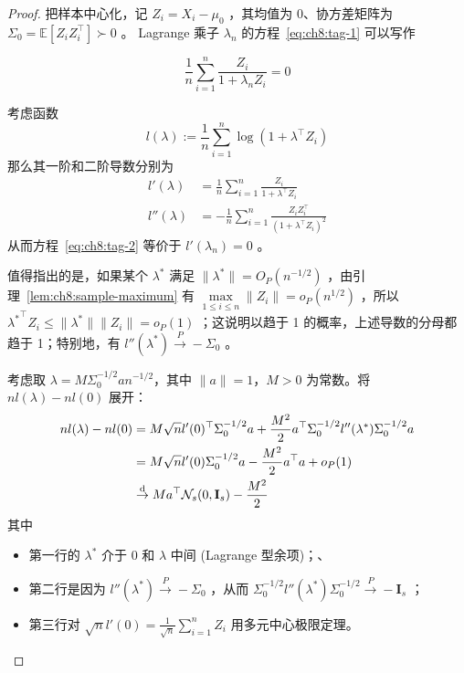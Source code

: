 \begin{proof}

把样本中心化，记 $Z_i=X_i-\mu_0$ ，其均值为 0、协方差矩阵为 $\Sigma_0=\mathbb{E}[Z_iZ_i^\top]\succ 0$ 。 Lagrange 乘子 $\lambda_n$ 的方程~\eqref{eq:ch8:tag-1} 可以写作

\begin{equation}
\label{eq:ch8:tag-2}
\frac1n\sum_{i=1}^n\frac{Z_i}{1+\lambda_n Z_i}=0
\end{equation}

考虑函数 \[ l(\lambda):=\frac1n\sum_{i=1}^n\log(1+\lambda^\top Z_i) \]那么其一阶和二阶导数分别为
\[\begin{aligned}l'(\lambda) &= \frac{1}{n}\sum_{i=1}^n \frac{Z_i}{1 + \lambda^\top Z_i}\\ l''(\lambda) &= -\frac{1}{n}\sum_{i=1}^n \frac{Z_iZ_i^\top}{(1 + \lambda^\top Z_i)^2} \end{aligned}\]
从而方程~\eqref{eq:ch8:tag-2} 等价于 $l'(\lambda_n)=0$ 。

值得指出的是，如果某个 $\lambda^*$ 满足 $\|\lambda^*\|=O_P(n^{-1/2})$ ，由引理~\ref{lem:ch8:sample-maximum} 有 $\max\limits_{1\le i\le n}\|Z_i\|=o_P(n^{1/2})$ ，所以 ${\lambda^*}^\top Z_i\le \|\lambda^*\|\|Z_i\|=o_P(1)$ ；这说明以趋于 1 的概率，上述导数的分母都趋于 1；特别地，有 $l''(\lambda^*) \overset{P}\to -\Sigma_0$ 。

考虑取 $\lambda = M \Sigma_0^{-1/2} a n^{-1/2}$，其中 $\|a\| = 1$，$M>0$ 为常数。将 $n l(\lambda) - n l(0)$ 展开：
\[\begin{aligned} n l(\lambda) - n l(0)  &= M\sqrt{n}l'(0)^\top \Sigma_0^{-1/2} a + \frac{M^2}{2} a^\top \Sigma_0^{-1/2} l''(\lambda^*) \Sigma_0^{-1/2} a \\ &= M\sqrt{n}l'(0) \Sigma_0^{-1/2} a - \frac{M^2}{2} a^\top a + o_P(1) \\ &\overset{\rm d}\to M a^\top \mathcal{N}_s(0, \mathbf I_s) - \frac{M^2}{2} \end{aligned}\]
其中

\begin{itemize}
\tightlist
\item
  第一行的 $\lambda^*$ 介于 $0$ 和 $\lambda$ 中间 (Lagrange 型余项)；、
\item
  第二行是因为 $l''(\lambda^*) \overset{P}\to -\Sigma_0$ ，从而 $\Sigma_0^{-1/2} l''(\lambda^*) \Sigma_0^{-1/2} \overset{P}\to -\mathbf I_s$ ；
\item
  第三行对 $\textstyle \sqrt nl'(0)=\frac1{\sqrt n}\sum_{i=1}^nZ_i$ 用多元中心极限定理。
\end{itemize}


\end{proof}
